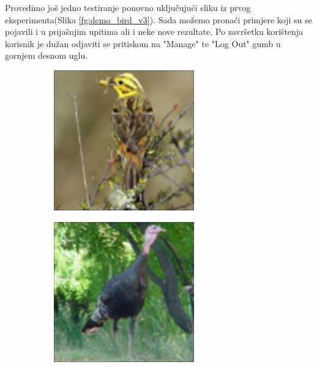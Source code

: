 \documentclass[times, utf8, proizvoljni, numeric]{fer}
\begin{document}
\newpage

Provedimo još jedno testiranje ponovno uključujući sliku iz prvog eksperimenta(Slika \ref{fg:demo_bird_v3}). Sada možemo pronaći primjere koji su se pojavili i u prijašnjim upitima ali i neke nove rezultate. Po završetku korištenja korisnik je dužan odjaviti se pritiskom na "Manage" te "Log Out" gumb u gornjem desnom uglu.


\begin{figure}[ht!]
	\begin{subfigure}[t]{0.19\textwidth}
		\includegraphics[width=\textwidth,height=\textwidth ]{./imgs/demo-preporucitelja-po-sadrzaju/tijek-rada/id@0.png}
	\end{subfigure}
	\begin{subfigure}[t]{0.19\textwidth}
		\includegraphics[width=\textwidth,height=\textwidth ]{./imgs/demo-preporucitelja-po-sadrzaju/tijek-rada/id@2.png}

\end{subfigure}
\end{figure}
\end{document}
